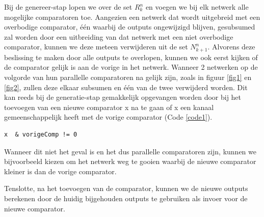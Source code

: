 \documentclass{article}
\begin{document}
Bij de genereer-stap lopen we over de set $R^n_k$ en voegen we bij elk netwerk alle mogelijke comparatoren toe.
Aangezien een netwerk dat wordt uitgebreid met een overbodige comparator, \'e\'en waarbij de outputs ongewijzigd blijven, gesubsumed zal worden door een uitbreiding van dat netwerk met een niet overbodige comparator, kunnen we deze meteen verwijderen uit de set $N^n_{k+1}$. 
Alvorens deze beslissing te maken door alle outputs te overlopen, kunnen we ook eerst kijken of de comparator gelijk is aan de vorige in het netwerk.
Wanneer 2 netwerken op de volgorde van hun parallelle comparatoren na gelijk zijn, zoals in figuur \ref{fig1} en \ref{fig2}, zullen deze elkaar subsumen en \'e\'en van de twee verwijderd worden.
Dit kan reeds bij de generatie-stap gemakkelijk opgevangen worden door bij het toevoegen van een nieuwe comparator x na te gaan of x een kanaal gemeenschappelijk heeft met de vorige comparator (Code \ref{code1}).
\begin{lstlisting}[caption={Test op parallelle comparatoren},label=code1]
x  & vorigeComp != 0
\end{lstlisting}
Wanneer dit niet het geval is en het dus parallelle comparatoren zijn, kunnen we bijvoorbeeld kiezen om het netwerk weg te gooien waarbij de nieuwe comparator kleiner is dan de vorige comparator.

Tenslotte, na het toevoegen van de comparator, kunnen we de nieuwe outputs berekenen door de huidig bijgehouden outputs te gebruiken als invoer voor de nieuwe comparator.
\end{document}
